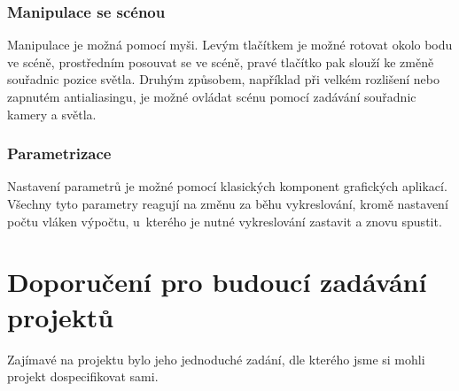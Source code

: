 \documentclass[12pt,a4paper,titlepage,final]{report}
\begin{document}
\subsection{Manipulace se scénou}
Manipulace je možná pomocí myši. Levým tlačítkem je možné rotovat okolo bodu ve scéně, prostředním posouvat se ve scéně,
pravé tlačítko pak slouží ke změně souřadnic pozice světla. Druhým způsobem, například při velkém rozlišení nebo zapnutém antialiasingu, je možné ovládat scénu pomocí zadávání souřadnic kamery a světla.

\subsection{Parametrizace}
Nastavení parametrů je možné pomocí klasických komponent grafických aplikací. Všechny tyto parametry reagují na změnu za běhu vykreslování, kromě nastavení počtu vláken výpočtu, u~kterého je nutné vykreslování zastavit a znovu spustit.

\chapter{Doporučení pro budoucí zadávání projektů}

Zajímavé na projektu bylo jeho jednoduché zadání, dle kterého jsme si mohli projekt dospecifikovat sami. 





\end{document}
